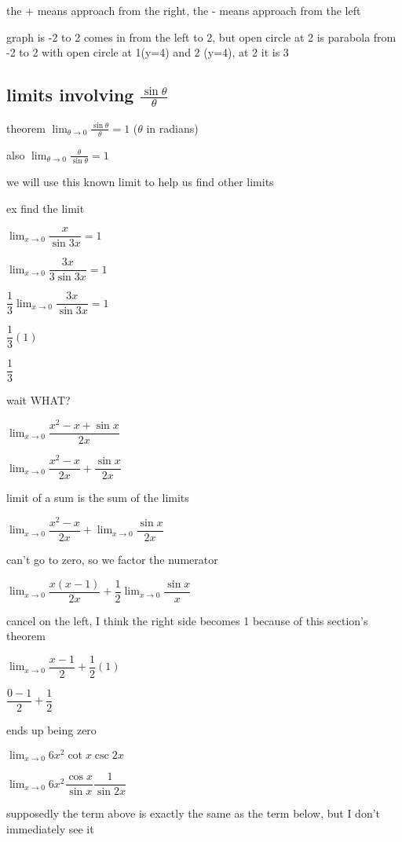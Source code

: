 \documentclass[12pt]{article}
\begin{document}
the + means approach from the right,
the - means approach from the left

graph is -2 to 2
comes in from the left to 2, but open circle at 2
is parabola from -2 to 2
with open circle at 1(y=4) and 2 (y=4), at 2 it is 3

\subsection{limits involving $\frac{\sin{\theta{}}}{\theta{}}$}

theorem $\lim_{\theta \to 0} \frac{\sin \theta}{\theta} = 1$ ($\theta$ in radians)

also $\lim_{\theta \to 0} \frac{\theta}{\sin \theta} = 1$

we will use this known limit to help us find other limits

ex find the limit

$\lim_{x \to 0} \dfrac{x}{\sin 3x} = 1$

$\lim_{x \to 0} \dfrac{3x}{3\sin 3x} = 1$

$\dfrac{1}{3} \lim_{x \to 0} \dfrac{3x}{\sin 3x} = 1$

$\dfrac{1}{3}(1)$

$\dfrac{1}{3}$

wait WHAT?

$\lim_{x \to 0}\dfrac{x^2 - x + \sin x}{2x}$

$\lim_{x \to 0}\dfrac{x^2 - x}{2x} + \dfrac{\sin x}{2x}$

limit of a sum is the sum of the limits

$\lim_{x \to 0}\dfrac{x^2 - x}{2x} + \lim_{x \to 0} \dfrac{\sin x}{2x}$

can't go to zero, so we factor the numerator

$\lim_{x \to 0}\dfrac{x(x - 1)}{2x} +\dfrac{1}{2} \lim_{x \to 0} \dfrac{\sin x}{x}$

cancel on the left, I think the right side becomes 1 because of this section's theorem

$\lim_{x \to 0}\dfrac{x - 1}{2} +\dfrac{1}{2} (1)$

$\dfrac{0-1}{2} + \dfrac{1}{2}$

ends up being zero

$\lim_{x \to 0} 6x^2 \cot x \csc 2x$

$\lim_{x \to 0} 6x^2 \dfrac{\cos x}{\sin x} \dfrac{1}{\sin 2x}$

supposedly the term above is exactly the same as the term below, but I don't immediately see it
\end{document}
